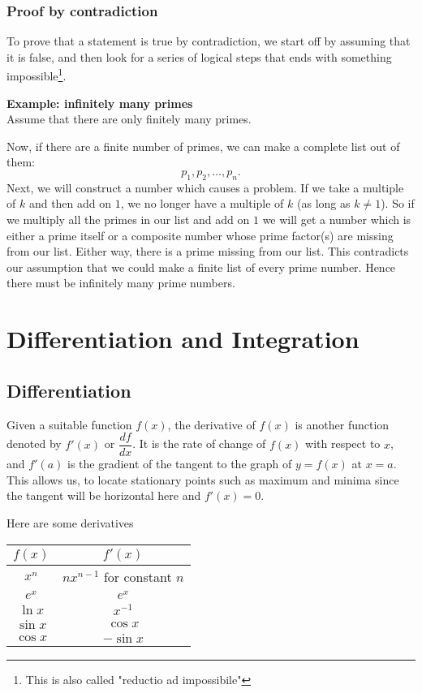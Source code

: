 \documentclass[10pt, a4paper]{article}
\begin{document}
\subsubsection{Proof by contradiction}
To prove that a statement is true by contradiction, we start off by assuming that it is false, and then look for a series of logical steps that ends with something impossible\footnote{This is also called "reductio ad impossibile"}.

\textbf{Example: infinitely many primes} \\
Assume that there are only finitely many primes.

Now, if there are a finite number of primes, we can make a complete list out of them:
\[
p_1, p_2, \dotsc, p_n.
\]
Next, we will construct a number which causes a problem. If we take a multiple of $k$ and then add on $1$, we no longer have a multiple of $k$ (as long as $k \neq 1$). So if we multiply all the primes in our list and add on $1$ we will get a number which is either a prime itself or a composite number whose prime factor(s) are missing from our list. Either way, there is a prime missing from our list. This contradicts our assumption that we could make a finite list of every prime number. Hence there must be infinitely many prime numbers.

\newpage

\section{Differentiation and Integration}

\subsection{Differentiation}
Given a suitable function $f(x)$, the derivative of $f(x)$ is another function denoted by $f'(x)$ or $\dfrac{df}{dx}$. It is the rate of change of $f(x)$ with respect to $x$, and $f'(a)$ is the gradient of the tangent to the graph of $y = f(x)$ at $x = a$. This allows us, to locate stationary points such as maximum and minima since the tangent will be horizontal here and $f'(x) = 0$.

Here are some derivatives

\begin{table}[ht]
    \centering
    \begin{tabular}{|c|c|}
        \hline
        $f(x)$ & $f'(x)$ \\
        \hline
        $x ^ n$ & $nx ^ {n - 1}$ for constant $n$ \\
        \hline
        $e ^ x$ & $e ^ x$ \\
        \hline
        $\ln{x}$ & $x ^ {-1}$ \\
        \hline
        $\sin{x}$ & $\cos{x}$ \\
        \hline
        $\cos{x}$ & $-\sin{x}$ \\
        \hline
    \end{tabular}
\end{table}
\end{document}
